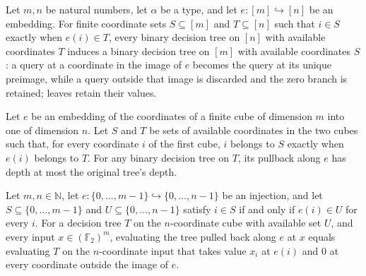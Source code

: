 \begin{definition}
\leanok
{}
Let $m,n$ be natural numbers, let $\alpha$ be a type, and let $e:[m]\hookrightarrow[n]$
be an embedding. For finite coordinate sets $S\subseteq[m]$ and $T\subseteq[n]$ such
that $i\in S$ exactly when $e(i)\in T$, every binary decision tree on $[n]$ with
available coordinates $T$ induces a binary decision tree on $[m]$ with available
coordinates $S$: a query at a coordinate in the image of $e$ becomes the query at its
unique preimage, while a query outside that image is discarded and the zero branch is
retained; leaves retain their values.
\end{definition}

\begin{theorem}
\leanok
{}
Let $e$ be an embedding of the coordinates of a finite cube of dimension $m$ into one of
dimension $n$. Let $S$ and $T$ be sets of available coordinates in the two cubes such
that, for every coordinate $i$ of the first cube, $i$ belongs to $S$ exactly when $e(i)$
belongs to $T$. For any binary decision tree on $T$, its pullback along $e$ has depth at
most the original tree's depth.
\end{theorem}

\begin{theorem}
\leanok
{}
Let $m,n\in\mathbb{N}$, let $e:\{0,\ldots,m-1\}\hookrightarrow\{0,\ldots,n-1\}$ be an
injection, and let $S\subseteq\{0,\ldots,m-1\}$ and $U\subseteq\{0,\ldots,n-1\}$ satisfy
$i\in S$ if and only if $e(i)\in U$ for every $i$. For a decision tree $T$ on the
$n$-coordinate cube with available set $U$, and every input $x\in(\mathbb{F}_2)^m$,
evaluating the tree pulled back along $e$ at $x$ equals evaluating $T$ on the
$n$-coordinate input that takes value $x_i$ at $e(i)$ and $0$ at every coordinate
outside the image of $e$.
\end{theorem}

